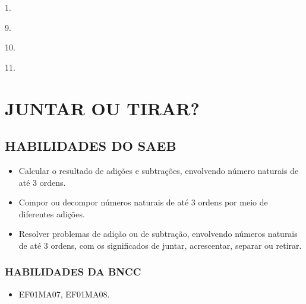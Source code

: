 \begin{multicols}{2}
\begin{escolha}
\item
  1.
\item
  9.
\item
  10.
\item
  11.
\end{escolha}
\end{multicols}

\chapter{JUNTAR OU TIRAR?}


\section{HABILIDADES DO SAEB}

\begin{itemize}
\item Calcular o resultado de adições e subtrações, envolvendo número
naturais de até 3 ordens.

\item Compor ou decompor números naturais de até 3 ordens por meio de
diferentes adições.

\item Resolver problemas de adição ou de subtração, envolvendo números
naturais de até 3 ordens, com os significados de juntar, acrescentar,
separar ou retirar.
\end{itemize}

\subsection{HABILIDADES DA BNCC}

\begin{itemize}
\item EF01MA07, EF01MA08.
\end{itemize}


